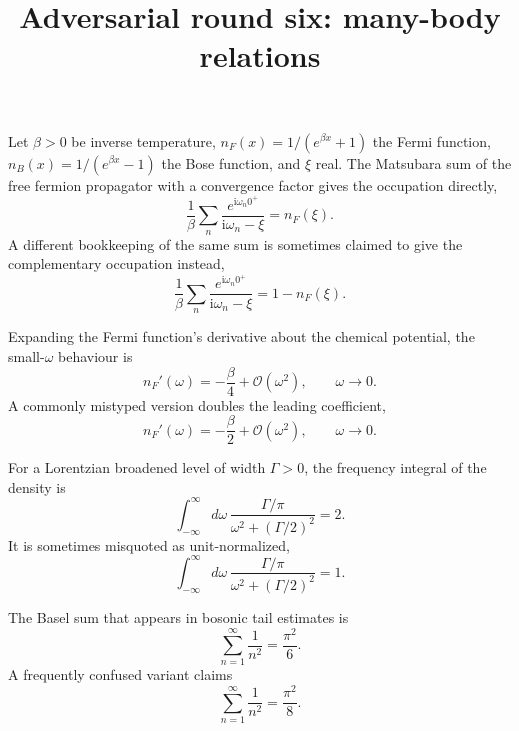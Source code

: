 \documentclass{article}
\title{Adversarial round six: many-body relations}
\newcommand{\ii}{\mathrm{i}}
\begin{document}
\maketitle

Let $\beta>0$ be inverse temperature, $n_F(x)=1/(e^{\beta x}+1)$ the Fermi
function, $n_B(x)=1/(e^{\beta x}-1)$ the Bose function, and $\xi$ real.
The Matsubara sum of the free fermion propagator with a convergence
factor gives the occupation directly,
\begin{equation}
\label{eq:matsubara-true}
\frac{1}{\beta}\sum_n \frac{e^{\ii\omega_n 0^+}}{\ii\omega_n-\xi} = n_F(\xi).
\end{equation}
A different bookkeeping of the same sum is sometimes claimed to give the
complementary occupation instead,
\begin{equation}
\label{eq:matsubara-false}
\frac{1}{\beta}\sum_n \frac{e^{\ii\omega_n 0^+}}{\ii\omega_n-\xi} = 1-n_F(\xi).
\end{equation}

Expanding the Fermi function's derivative about the chemical potential,
the small-$\omega$ behaviour is
\begin{equation}
\label{eq:remainder-true}
n_F'(\omega) = -\frac{\beta}{4} + \mathcal{O}(\omega^2), \qquad \omega\to 0.
\end{equation}
A commonly mistyped version doubles the leading coefficient,
\begin{equation}
\label{eq:remainder-false}
n_F'(\omega) = -\frac{\beta}{2} + \mathcal{O}(\omega^2), \qquad \omega\to 0.
\end{equation}

For a Lorentzian broadened level of width $\Gamma>0$, the frequency
integral of the density is
\begin{equation}
\label{eq:integral-true}
\int_{-\infty}^{\infty} d\omega\, \frac{\Gamma/\pi}{\omega^2+(\Gamma/2)^2} = 2.
\end{equation}
It is sometimes misquoted as unit-normalized,
\begin{equation}
\label{eq:integral-false}
\int_{-\infty}^{\infty} d\omega\, \frac{\Gamma/\pi}{\omega^2+(\Gamma/2)^2} = 1.
\end{equation}

The Basel sum that appears in bosonic tail estimates is
\begin{equation}
\label{eq:series-true}
\sum_{n=1}^{\infty}\frac{1}{n^2} = \frac{\pi^2}{6}.
\end{equation}
A frequently confused variant claims
\begin{equation}
\label{eq:series-false}
\sum_{n=1}^{\infty}\frac{1}{n^2} = \frac{\pi^2}{8}.
\end{equation}
\end{document}
